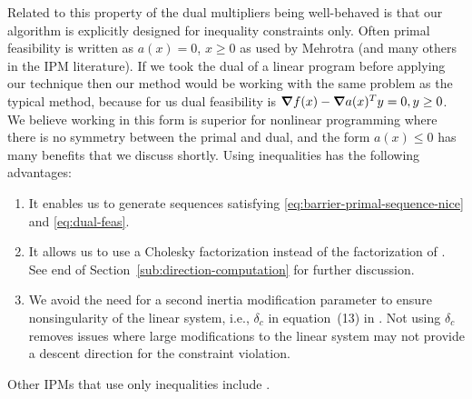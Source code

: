 \documentclass{article}
\begin{document}
Related to this property of the dual multipliers being well-behaved is that our algorithm is explicitly designed for inequality constraints only. Often primal feasibility is written as $a(x)=0$, $x \ge 0$ as used by Mehrotra (and many others in the IPM literature). If we took the dual of a linear program before applying our technique then our method would be working with the same problem as the typical method, because for us dual feasibility is $\grad f(x) - \grad a(x)^T y = 0, y \ge 0$. We believe working in this form is superior for nonlinear programming where there is no symmetry between the primal and dual, and the form $a(x) \le 0$ has many benefits that we discuss shortly. Using inequalities has the following advantages:
\begin{enumerate}
\item It enables us to generate sequences satisfying \eqref{eq:barrier-primal-sequence-nice} and \eqref{eq:dual-feas}.
\item It allows us to use a Cholesky factorization instead of the  \LBL{} factorization of \citet*{bunch1971direct}. See end of Section~\ref{sub:direction-computation} for further discussion.
\item We avoid the need for a second inertia modification parameter to ensure nonsingularity of the linear system, i.e., $\delta_{c}$ in equation~(13) in \cite{wachter2006implementation}.  Not using $\delta_{c}$ removes issues where large modifications to the linear system may not provide a descent direction for the constraint violation.
\end{enumerate}
Other IPMs that use only inequalities include \cite{curtis2012penalty,vanderbei1999loqo}.



\end{document}
